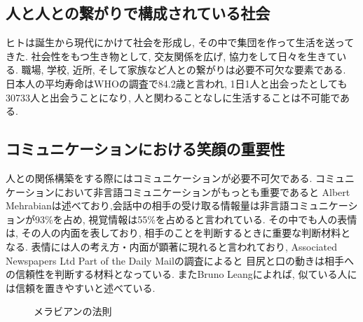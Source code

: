 \subsection{人と人との繋がりで構成されている社会}
ヒトは誕生から現代にかけて社会を形成し, その中で集団を作って生活を送ってきた.
社会性をもつ生き物として, 交友関係を広げ, 協力をして日々を生きている.
職場, 学校, 近所, そして家族など人との繋がりは必要不可欠な要素である.
日本人の平均寿命はWHOの調査で84.2歳\cite{WHO_reserch}と言われ,
1日1人と出会ったとしても30733人と出会うことになり, 人と関わることなしに生活することは不可能である.


\subsection{コミュニケーションにおける笑顔の重要性}
人との関係構築をする際にはコミュニケーションが必要不可欠である.
コミュニケーションにおいて非言語コミュニケーションがもっとも重要であると
Albert Mehrabianは述べており,会話中の相手の受け取る情報量は非言語コミュニケーションが93\%を占め,
視覚情報は55\%を占めると言われている\cite{rule_of_Mehrabian}.
その中でも人の表情は, その人の内面を表しており, 相手のことを判断するときに重要な判断材料となる.
表情には人の考え方・内面が顕著に現れると言われており,
Associated Newspapers Ltd Part of the Daily Mailの調査によると
目尻と口の動きは相手への信頼性を判断する材料となっている\cite{TheMailonSunday}.
またBruno Leangによれば, 似ている人には信頼を置きやすいと述べている\cite{Bruno}.

\begin{figure}[htbp]
    \begin{center}
    \end{center}
    \caption{メラビアンの法則}
    \label{fig:mehrabian}
\end{figure}

